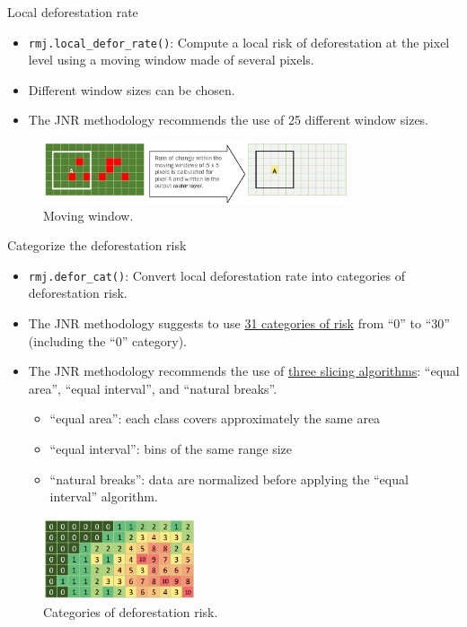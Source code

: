 \documentclass[10pt,table,dvipsnames,compress]{beamer}
\begin{document}
\begin{frame}[label={sec:orge607d24},fragile]{Local deforestation rate}
 \begin{itemize}
\item \texttt{rmj.local\_defor\_rate()}: Compute a local risk of deforestation at the pixel level using a moving window made of several pixels.
\item Different window sizes can be chosen.
\item The JNR methodology recommends the use of 25 different window sizes.
\end{itemize}

\begin{figure}[htbp]
\centering
\includegraphics[width=0.8\textwidth]{figs/moving_window.png}
\caption{\label{fig:orgde756e4}Moving window.}
\end{figure}
\end{frame}

\begin{frame}[label={sec:org3220b62},fragile]{Categorize the deforestation risk}
 \begin{itemize}
\item \texttt{rmj.defor\_cat()}: Convert local deforestation rate into categories of deforestation risk.
\item The JNR methodology suggests to use \uline{31 categories of risk} from ``0'' to ``30'' (including the ``0'' category).
\item The JNR methodology recommends the use of \uline{three slicing algorithms}: ``equal area'', ``equal interval'', and ``natural breaks''.
\begin{itemize}
\item ``equal area'': each class covers approximately the same area
\item ``equal interval'': bins of the same range size
\item ``natural breaks'': data are normalized before applying the ``equal interval'' algorithm.
\end{itemize}
\end{itemize}

\begin{figure}[htbp]
\centering
\includegraphics[width=0.4\textwidth]{figs/categories.png}
\caption{\label{fig:orge93bc49}Categories of deforestation risk.}
\end{figure}
\end{frame}
\end{document}
